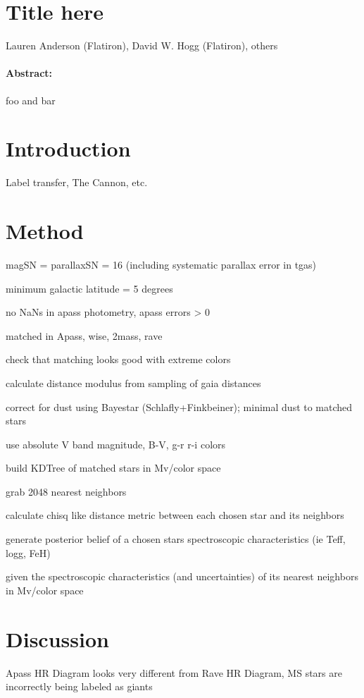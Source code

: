 \documentclass[11pt,letterpaper]{article}
\begin{document}
\section*{Title here}

\noindent
Lauren Anderson (Flatiron), David W. Hogg (Flatiron), others

\paragraph{Abstract:}
foo and bar

\section{Introduction}

Label transfer, The Cannon, etc.

\section{Method}

magSN = parallaxSN = 16 (including systematic parallax error in tgas)

minimum galactic latitude = 5 degrees

no NaNs in apass photometry, apass errors > 0

matched in Apass, wise, 2mass, rave

check that matching looks good with extreme colors

calculate distance modulus from sampling of gaia distances

correct for dust using Bayestar (Schlafly+Finkbeiner); minimal dust to matched stars

use absolute V band magnitude, B-V, g-r r-i colors

build KDTree of matched stars in Mv/color space

grab 2048 nearest neighbors

calculate chisq like distance metric between each chosen star and its neighbors

generate posterior belief of a chosen stars spectroscopic characteristics (ie Teff, logg, FeH)

given the spectroscopic characteristics (and uncertainties) of its nearest neighbors in Mv/color space

\section{Discussion}

Apass HR Diagram looks very different from Rave HR Diagram, MS stars are incorrectly being labeled as giants
\end{document}
